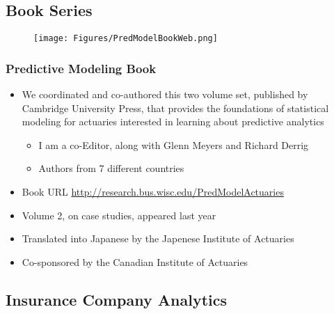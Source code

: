 \documentclass[serif,10pt]{beamer}
\begin{document}
\subsection{Book Series}


\begin{frame}
\vspace{-.8in}
\begin{figure}[htp]
    \texttt{[image: Figures/PredModelBookWeb.png]}
\end{figure}
\end{frame}

\begin{frame}
\frametitle{Predictive Modeling Book}
  \begin{itemize}
  \item We coordinated and co-authored this two volume set, published by Cambridge University Press, that provides the foundations of statistical modeling for actuaries interested in learning about predictive analytics
  \begin{itemize}  \item I am a co-Editor, along with Glenn Meyers and Richard Derrig
  \item Authors from 7 different countries
  \end{itemize}
\item Book URL \url{http://research.bus.wisc.edu/PredModelActuaries}
\item Volume 2, on case studies, appeared last year
\item Translated into Japanese by the Japenese Institute of Actuaries
\item Co-sponsored by the Canadian Institute of Actuaries
\end{itemize}
\end{frame}


\subsection[Overview Paper]{Insurance Company Analytics}
\end{document}
